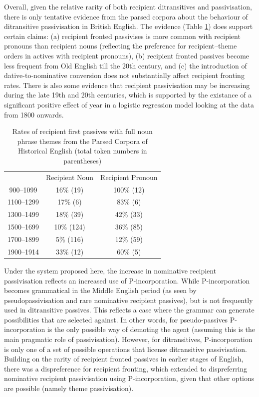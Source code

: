 	Overall, given the relative rarity of both recipient ditransitives and passivisation, there is only tentative evidence from the parsed corpora about the behaviour of ditransitive passivisation in British English. The evidence (Table \ref{tab:rec-pas-brit}) does support certain claims: (a) recipient fronted passivises is more common with recipient pronouns than recipient nouns (reflecting the preference for recipient--theme orders in actives with recipient pronouns), (b) recipient fronted passives become less frequent from Old English till the 20th century, and (c) the introduction of dative-to-nominative conversion does not substantially affect recipient fronting rates. There is also some evidence that recipient passivisation may be increasing during the late 19th and 20th centuries, which is supported by the existance of a significant positive effect of year in a logistic regression model looking at the data from 1800 onwards.

	\begin{table}[ht!]
		\begin{tabular}{ccc}
				&	Recipient Noun	& Recipient Pronoun \\
		900--1099	&	16\% (19)	& 100\% (12) \\
		1100--1299	&	17\% (6)	& 83\% (6) \\
		1300--1499	&	18\% (39)	& 42\% (33) \\
		1500--1699	&	10\% (124)	& 36\% (85) \\
		1700--1899	&	5\% (116)	& 12\% (59) \\
		1900--1914	&	33\% (12)	& 60\% (5) \\
		\end{tabular}
		\caption{Rates of recipient first passives with full noun phrase themes from the Parsed Corpora of Historical English (total token numbers in parentheses)}
		\label{tab:rec-pas-brit}
	\end{table}

	Under the system proposed here, the increase in nominative recipient passivisation reflects an increased use of P-incorporation. While P-incorporation becomes grammatical in the Middle English period (as seen by pseudopassivisation and rare nominative recipient passives), but is not frequently used in ditransitive passives. This reflects a case where the grammar can generate possibilities that are selected against. In other words, for pseudo-passives P-incorporation is the only possible way of demoting the agent (assuming this is the main pragmatic role of passivisation). However, for ditransitives, P-incorporation is only one of a set of possible operations that license ditransitive passivisation. Building on the rarity of recipient fronted passives in earlier stages of English, there was a dispreference for recipient fronting, which extended to dispreferring nominative recipient passivisation using P-incorporation, given that other options are possible (namely theme passivisation).


